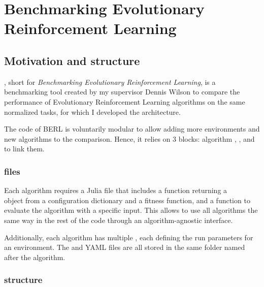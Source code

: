 \chapter{Benchmarking Evolutionary Reinforcement Learning}
\label{chap:berl}

\section{Motivation and structure}

, short for \textit{Benchmarking Evolutionary Reinforcement Learning}, is a benchmarking tool created by my supervisor Dennis Wilson to compare the performance of Evolutionary Reinforcement Learning algorithms on the same normalized tasks, for which I developed the architecture. 

The code of BERL is voluntarily modular to allow adding more environments and new algorithms to the comparison. Hence, it relies on 3 blocks: algorithm , , and  to link them.

\subsection{ files}

Each algorithm requires a  Julia file that includes a function returning a \\ object from a configuration dictionary and a fitness function, and a  function to evaluate the algorithm with a specific input. This allows to use all algorithms the same way in the rest of the code through an algorithm-agnostic interface. 

Additionally, each algorithm has multiple , each defining the run parameters for an environment. The  and YAML files are all stored in the same folder named after the algorithm.

\subsection{ structure}


